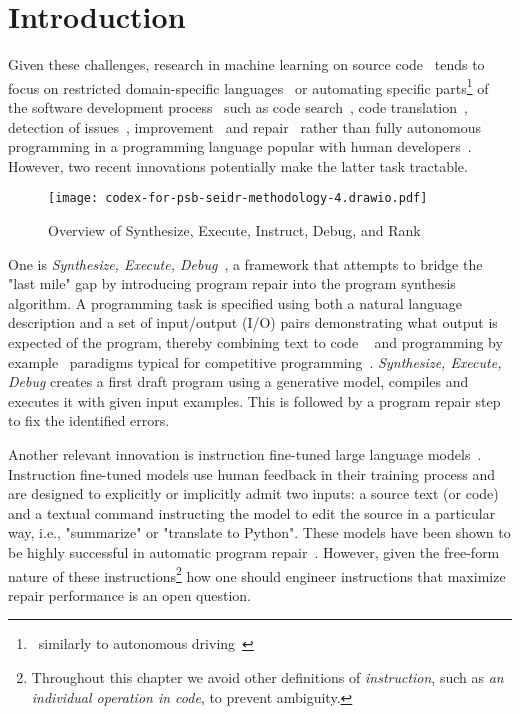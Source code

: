 \section{Introduction}
\label{sec:intro}





Given these challenges, research in machine learning on source code~\cite{allamanis2018:survey} tends to focus on restricted domain-specific languages~\cite{chen2021:latent,polozov2015:flashmeta,liventsev2021:bf} or automating specific parts\footnote{~similarly to autonomous driving~\cite{grigorescu2020:survey,marcano2020:review}} of the software development process~\cite{lu2021:codexglue,niu2023:crosscodebench} such as code search~\cite{husain2020:codesearchnet}, code translation~\cite{roziere2020:unsupervised}, detection of issues~\cite{fernandes2016:reviewbased,chakraborty2021:deep}, improvement~\cite{petke2018:genetic} and repair~\cite{legoues2019:automated} rather than fully autonomous programming in a programming language popular with human developers~\cite{:tiobe}.
However, two recent innovations potentially make the latter task tractable.

\begin{figure*}
    \centering
    \texttt{[image: codex-for-psb-seidr-methodology-4.drawio.pdf]}
    \caption{Overview of Synthesize, Execute, Instruct, Debug, and Rank}
    \label{fig:method}
\end{figure*}

One is \emph{Synthesize, Execute, Debug}~\cite{gupta2020:synthesize}, a framework that attempts to bridge the "last mile" gap by introducing program repair into the program synthesis algorithm. 
A programming task is specified using both a natural language description and a set of input/output (I/O) pairs demonstrating what output is expected of the program, thereby combining text to code ~\cite{iyer2018:mapping} and programming by example~\cite{halbert1984:programming,gulwani2016:programming} paradigms typical for competitive programming~\cite{zavershynskyi2018:naps}.
\emph{Synthesize, Execute, Debug} creates a first draft program using a generative model, compiles and executes it with given input examples.
This is followed by a program repair step to fix the identified errors.

Another relevant innovation is instruction fine-tuned large language models~\cite{ouyang2022:training}. Instruction fine-tuned models use human feedback in their training process and are designed to explicitly or implicitly admit two inputs: a source text (or code) and a textual command instructing the model to edit the source in a particular way, i.e., "summarize" or "translate to Python".
These models have been shown to be highly successful in automatic program repair~\cite{fan2023:automated}. 
However, given the free-form nature of these instructions\footnote{Throughout this chapter we avoid other definitions of \emph{instruction}, such as \emph{an individual operation in code}, to prevent ambiguity.} how one should engineer instructions that maximize repair performance is an open question. 

